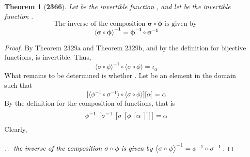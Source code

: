 \documentclass[preview]{standalone}
\newtheorem{theorem}{Theorem}
\begin{document}
\begin{theorem}[\textbf{2366}]
    Let \bm{$\sigma$} be the invertible function 
    \bm{$\sigma : \Theta \rightarrow \Omega$}, 
    and let \bm{$\phi$} be the invertible function 
    \bm{$\phi : \Phi \rightarrow \Theta$}. 
    \begin{equation*}
        \text{The inverse of the composition }
        \bm{\sigma \circ \phi}
        \text{ is given by }
    \end{equation*}
    \begin{equation*}
        \bm{
            \big \langle \sigma \circ \phi \big \rangle ^{-1} 
                = \phi ^{-1} \circ \sigma ^{-1}
            }
    \end{equation*}
\end{theorem}

\begin{proof}
    By Theorem 2329a and Theorem 2329b, and by the definition for bijective functions, 
    \bm{$\sigma \circ \phi$} is invertible. 
    Thus, 
    \begin{equation*}
        \big \langle \sigma \circ \phi \big \rangle ^{-1} 
            \circ 
        \big \langle \sigma \circ \phi \big \rangle 
            = 
        \iota_{\alpha}
    \end{equation*}
    What remains to be determined is whether 
    . 
    Let \bm{$\alpha$} be an element in the domain \bm{$\Phi$} such that 
    \begin{equation*}
        \big[
            \big \langle \phi ^{-1} \circ \sigma ^{-1} \big \rangle 
                \circ 
            \big \langle \sigma \circ \phi \big \rangle
        \big] 
            \big[ \alpha \big] 
            = 
        \alpha
    \end{equation*}
    By the definition for the composition of functions, 
    that is 
    \begin{equation*}
        \phi ^{-1} \text{\space} \big[ 
            \sigma ^{-1} \text{\space} \big[ 
                \sigma \text{\space} \big[ 
                    \phi \text{\space} \big[
                        \alpha \text{\space}
                    \big]
                \big]
            \big]
        \big]
             = 
        \alpha
    \end{equation*}
    Clearly, 
    \\ \\
    $\therefore \text{ \emph{the inverse of the composition} } \relax{
        \sigma \circ \phi 
        \text{ \emph{is given by} }
        \big \langle \sigma \circ \phi \big \rangle ^{-1} 
            = 
        \phi^{-1} \circ \sigma^{-1}
    }$.
\end{proof}
\end{document}
